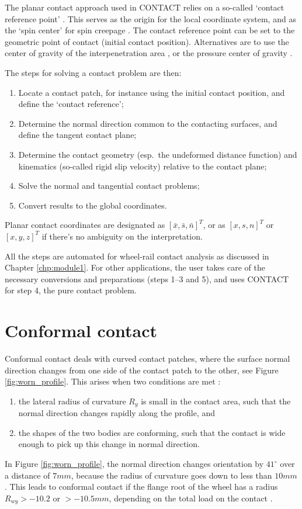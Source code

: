 \documentclass[12pt]{report}
\begin{document}
The planar contact approach used in CONTACT relies on a so-called `contact
reference point' \cite{Vollebregt2020b-wrgeom}. This serves as the origin
for the local coordinate system, and as the `spin center' for spin creepage
\cite{Vollebregt2018a-sdec}. The contact reference point can be set to the
geometric point of contact (initial contact position). Alternatives are to
use the center of gravity of the interpenetration area
\cite{Vollebregt2011b-iavsd2011}, or the pressure center of gravity
\cite{Vollebregt2018a-sdec}.

The steps for solving a contact problem are then:
\begin{enumerate}
\item Locate a contact patch, for instance using the initial contact
        position, and define the `contact reference';
\item Determine the normal direction common to the contacting surfaces, and
        define the tangent contact plane;
\item Determine the contact geometry (esp.\ the undeformed distance
        function) and kinematics (so-called rigid slip velocity) relative to the
        contact plane;
\item Solve the normal and tangential contact problems;
\item Convert results to the global coordinates.
\end{enumerate}
Planar contact coordinates are designated as $[\bar{x},\bar{s},\bar{n}]^T$,
or as $[x,s,n]^T$ or $[x,y,z]^T$ if there's no ambiguity on the
interpretation.

All the steps are automated for wheel-rail contact analysis as discussed in
Chapter \ref{chp:module1}.  For other applications, the user takes care of
the necessary conversions and preparations (steps 1--3 and 5), and uses
CONTACT for step 4, the pure contact problem.

\section{Conformal contact}

Conformal contact deals with curved contact patches, where the surface
normal direction changes from one side of the contact patch to the other,
see Figure \ref{fig:worn_profile}. This arises when two conditions are met
\cite{Vollebregt2018b-corrigendum}:
\begin{enumerate}
\item the lateral radius of curvature $R_y$ is small in the contact area,
        such that the normal direction changes rapidly along the profile,
        and
\item the shapes of the two bodies are conforming, such that the contact is
        wide enough to pick up this change in normal direction.
\end{enumerate}
In Figure \ref{fig:worn_profile}, the normal direction changes orientation
by $41^\circ$ over a distance of $7\unit{mm}$, because the radius of curvature
goes down to less than $10\unit{mm}$. This leads to conformal contact if the
flange root of the wheel has a radius $R_{wy}>-10.2$ or $>-10.5\unit{mm}$,
depending on the total load on the contact \cite{Vollebregt2018b-corrigendum}.
\end{document}
